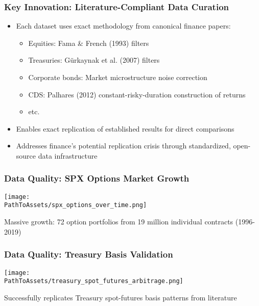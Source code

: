 \documentclass[ignorenonframetext, 9pt]{beamer}
\begin{document}
\begin{frame}[plain]
  \centering
  \vspace{0.2cm}
  \scalebox{0.9}{%
  }
\end{frame}

\begin{frame}
  \frametitle{Key Innovation: Literature-Compliant Data Curation}
  \begin{itemize}
  \item Each dataset uses exact methodology from canonical finance papers:
  \begin{itemize}
    \item Equities: Fama \& French (1993) filters
    \item Treasuries: Gürkaynak et al. (2007) filters
    \item Corporate bonds: Market microstructure noise correction
    \item CDS: Palhares (2012) constant-risky-duration construction of returns
    \item etc.
  \end{itemize}
  \vspace{0.2cm}
  \item Enables \alert{exact replication} of established results for direct comparisons
  \vspace{0.1cm}
  \item Addresses finance's potential replication crisis through standardized, open-source data infrastructure
  \end{itemize}
\end{frame}

\begin{frame}
  \frametitle{Data Quality: SPX Options Market Growth}
  \centering
  \texttt{[image: \\PathToAssets/spx\_options\_over\_time.png]}

  \vspace{0.3cm}
  Massive growth: 72 option portfolios from 19 million individual contracts (1996-2019)
\end{frame}

\begin{frame}
  \frametitle{Data Quality: Treasury Basis Validation}
  \centering
  \texttt{[image: \\PathToAssets/treasury\_spot\_futures\_arbitrage.png]}

  \vspace{0.3cm}
  Successfully replicates Treasury spot-futures basis patterns from literature
\end{frame}
\end{document}
